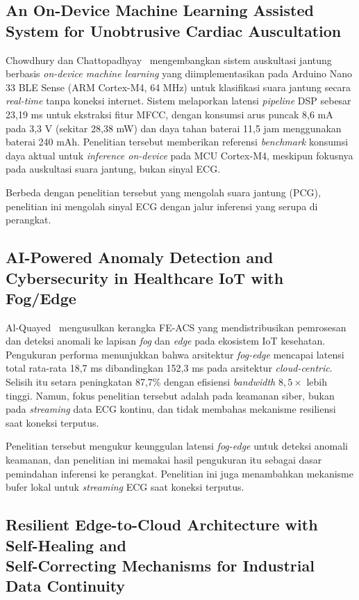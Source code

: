 \subsection{An On-Device Machine Learning Assisted System for Unobtrusive Cardiac Auscultation}

Chowdhury dan Chattopadhyay~\cite{chowdhury_2023} mengembangkan sistem auskultasi jantung berbasis \textit{on-device machine learning} yang diimplementasikan pada Arduino Nano 33 BLE Sense (ARM Cortex-M4, 64 MHz) untuk klasifikasi suara jantung secara \textit{real-time} tanpa koneksi internet. Sistem melaporkan latensi \textit{pipeline} DSP sebesar 23,19 ms untuk ekstraksi fitur MFCC, dengan konsumsi arus puncak 8,6 mA pada 3,3 V (sekitar 28,38 mW) dan daya tahan baterai 11,5 jam menggunakan baterai 240 mAh. Penelitian tersebut memberikan referensi \textit{benchmark} konsumsi daya aktual untuk \textit{inference on-device} pada MCU Cortex-M4, meskipun fokusnya pada auskultasi suara jantung, bukan sinyal ECG.

Berbeda dengan penelitian tersebut yang mengolah suara jantung (PCG), penelitian ini mengolah sinyal ECG dengan jalur inferensi yang serupa di perangkat.

\subsection{AI-Powered Anomaly Detection and Cybersecurity in Healthcare IoT with Fog/Edge}

Al-Quayed~\cite{al_quayed_2026} mengusulkan kerangka FE-ACS yang mendistribusikan pemrosesan dan deteksi anomali ke lapisan \textit{fog} dan \textit{edge} pada ekosistem IoT kesehatan. Pengukuran performa menunjukkan bahwa arsitektur \textit{fog-edge} mencapai latensi total rata-rata 18,7 ms dibandingkan 152,3 ms pada arsitektur \textit{cloud-centric}. Selisih itu setara peningkatan 87,7\% dengan efisiensi \textit{bandwidth} $8{,}5\times$ lebih tinggi. Namun, fokus penelitian tersebut adalah pada keamanan siber, bukan pada \textit{streaming} data ECG kontinu, dan tidak membahas mekanisme resiliensi saat koneksi terputus.

Penelitian tersebut mengukur keunggulan latensi \textit{fog-edge} untuk deteksi anomali keamanan, dan penelitian ini memakai hasil pengukuran itu sebagai dasar pemindahan inferensi ke perangkat. Penelitian ini juga menambahkan mekanisme bufer lokal untuk \textit{streaming} ECG saat koneksi terputus.

\subsection[Resilient Edge-to-Cloud Architecture with Self-Healing and Self-Correcting Mechanisms for Industrial Data Continuity]{Resilient Edge-to-Cloud Architecture with Self-Healing and\\ Self-Correcting Mechanisms for Industrial Data Continuity}

